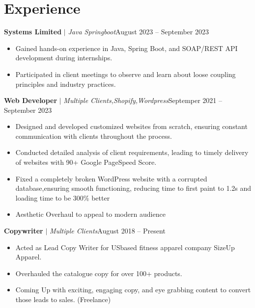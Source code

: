 
\section{Experience}
  \resumeSubHeadingListStart

          \resumeProjectHeading
          {\textbf{Systems Limited} $|$ \footnotesize\emph{Java Springboot}\vspace{8pt}}{August 2023 -- September 2023}
            \begin{itemize}
                \item Gained hands-on experience in Java, Spring Boot, and SOAP/REST API development during internships.
                \item 
                Participated in client meetings to observe and learn about loose coupling principles and industry practices.
            \end{itemize}
          
          \resumeProjectHeading
          {\textbf{Web Developer}\vspace{8pt} $|$ \footnotesize\emph{Multiple Clients,Shopify,Wordpress}}{Septemper 2021 -- September 2023}
            \begin{itemize}
              \item 
              Designed and developed customized websites from scratch, ensuring constant communication with clients throughout the process.
              \item 
              Conducted detailed analysis of client requirements, leading to timely delivery of websites with 90+ Google PageSpeed Score.  
              \item 
               Fixed a completely broken WordPress website with a corrupted database,ensuring smooth functioning, reducing time to first paint to 1.2s and loading time to be 300\% better
              \item 
              Aesthetic Overhaul to appeal to modern audience
          \end{itemize}

          \resumeProjectHeading
          {\textbf{Copywriter} $|$ \footnotesize\emph{Multiple Clients}\vspace{8pt}}{August 2018 -- Present}
          {\small{}}
          \begin{itemize}
              \item
              Acted as Lead Copy Writer for USbased fitness apparel company SizeUp Apparel.
              \item 
              Overhauled the catalogue copy for over 100+ products.
              \item
               Coming Up with exciting, engaging copy, and eye grabbing content to convert those leads to sales. (Freelance)
              
              
          \end{itemize}

    \resumeSubHeadingListEnd 